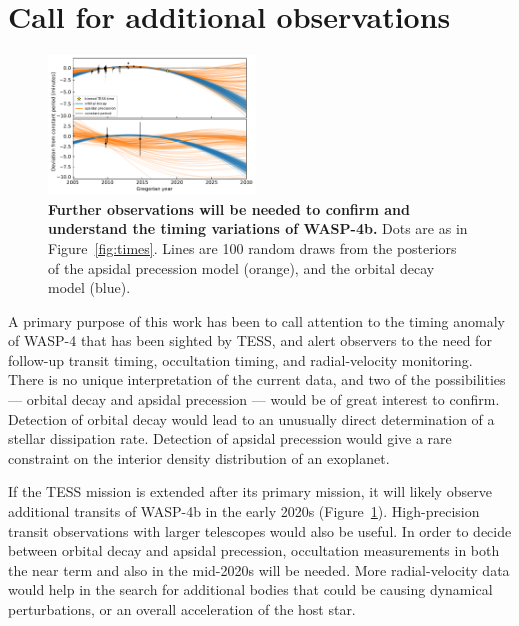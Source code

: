 \documentclass[12pt,twocolumn,tighten]{aastex62}
\begin{document}
\section{Call for additional observations}
\label{sec:future}

\begin{figure}[t]
	\begin{center}
		\leavevmode
		\includegraphics[width=0.49\textwidth]{f6.pdf}
	\end{center}
	\vspace{-0.5cm}
	\caption{
    {\bf Further observations will be needed to confirm and understand
    the timing variations of WASP-4b.} Dots are as in
    Figure~\ref{fig:times}.  Lines are 100 random draws from the
    posteriors of the apsidal precession model (orange), and the
    orbital decay model (blue).    
		\label{fig:future}
	}
\end{figure}

A primary purpose of this work has been to call attention to the
timing anomaly of WASP-4 that has been sighted by TESS, and alert
observers to the need for follow-up transit timing, occultation
timing, and radial-velocity monitoring.  There is no unique
interpretation of the current data, and two of the possibilities ---
orbital decay and apsidal precession --- would be of great interest to
confirm. Detection of orbital decay would lead to an unusually direct
determination of a stellar dissipation rate. Detection of apsidal
precession would give a rare constraint on the interior density
distribution of an exoplanet.

If the TESS mission is extended after its primary mission, it will
likely observe additional transits of WASP-4b in the early 2020s
(Figure~\ref{fig:future}).  High-precision transit observations with
larger telescopes would also be useful.  In order to decide between
orbital decay and apsidal precession, occultation measurements in both
the near term and also in the mid-2020s will be needed.  More
radial-velocity data would help in the search for additional bodies
that could be causing dynamical perturbations, or an overall acceleration
of the host star.
\end{document}
